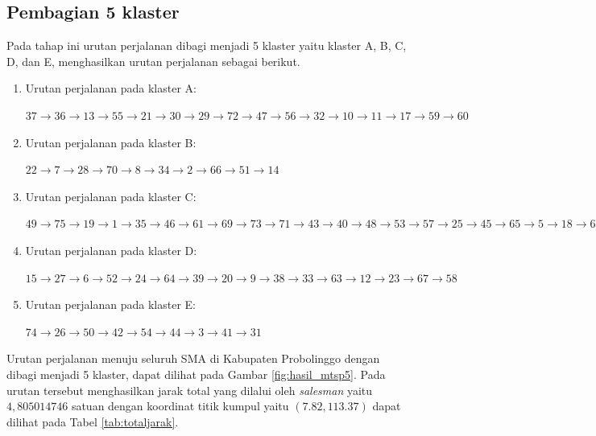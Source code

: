 \subsection{Pembagian 5 klaster}

Pada tahap ini urutan perjalanan dibagi menjadi 5 klaster yaitu klaster A, B, C, D, dan E, menghasilkan urutan perjalanan sebagai berikut.

\begin{enumerate}

\item Urutan perjalanan pada klaster A:

$37\rightarrow36\rightarrow13\rightarrow55\rightarrow21\rightarrow30\rightarrow29\rightarrow72\rightarrow47\rightarrow56\rightarrow32\rightarrow10\rightarrow11\rightarrow17\rightarrow59\rightarrow60$

\item Urutan perjalanan pada klaster B:

$22\rightarrow7\rightarrow28\rightarrow70\rightarrow8\rightarrow34\rightarrow2\rightarrow66\rightarrow51\rightarrow14$

\item Urutan perjalanan pada klaster C:

$49\rightarrow75\rightarrow19\rightarrow1\rightarrow35\rightarrow46\rightarrow61\rightarrow69\rightarrow73\rightarrow71\rightarrow43\rightarrow40\rightarrow48\rightarrow53\rightarrow57\rightarrow25\rightarrow45\rightarrow65\rightarrow5\rightarrow18\rightarrow68\rightarrow16\rightarrow4\rightarrow62$

\item Urutan perjalanan pada klaster D:

$15\rightarrow27\rightarrow6\rightarrow52\rightarrow24\rightarrow64\rightarrow39\rightarrow20\rightarrow9\rightarrow38\rightarrow33\rightarrow63\rightarrow12\rightarrow23\rightarrow67\rightarrow58$

\item Urutan perjalanan pada klaster E:

$74\rightarrow26\rightarrow50\rightarrow42\rightarrow54\rightarrow44\rightarrow3\rightarrow41\rightarrow31$

\end{enumerate}

Urutan perjalanan menuju seluruh SMA di Kabupaten Probolinggo dengan dibagi menjadi 5 klaster, dapat dilihat pada Gambar \ref{fig:hasil_mtsp5}. Pada urutan tersebut menghasilkan jarak total yang dilalui oleh \textit{salesman} yaitu $4,805014746$ satuan dengan koordinat titik kumpul yaitu $(7.82, 113.37)$ dapat dilihat pada Tabel \ref{tab:totaljarak}.

